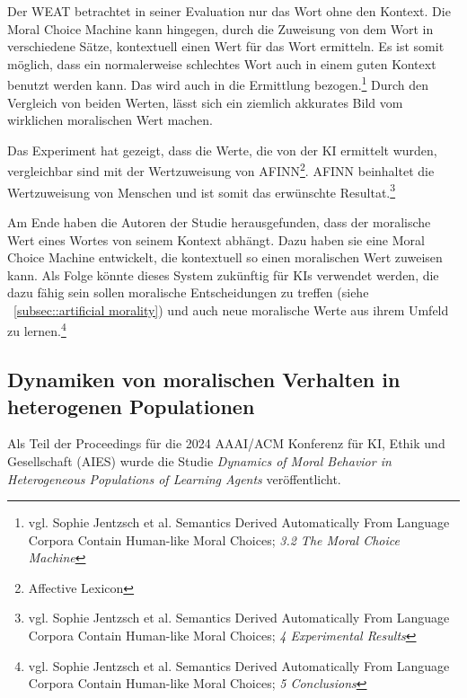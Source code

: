 Der WEAT betrachtet in seiner Evaluation nur das Wort ohne den Kontext.
Die Moral Choice Machine kann hingegen, durch die Zuweisung von dem Wort in verschiedene Sätze, kontextuell einen Wert für das
Wort ermitteln.
Es ist somit möglich, dass ein normalerweise schlechtes Wort auch in einem guten Kontext benutzt werden kann.
Das wird auch in die Ermittlung bezogen.\footnote{vgl. Sophie Jentzsch et al. Semantics Derived Automatically From Language Corpora Contain Human-like Moral Choices; \textit{3.2 The Moral Choice Machine}}
Durch den Vergleich von beiden Werten, lässt sich ein ziemlich akkurates Bild vom wirklichen moralischen Wert machen.

Das Experiment hat gezeigt, dass die Werte, die von der KI ermittelt wurden, vergleichbar sind mit der Wertzuweisung von AFINN\footnote{Affective Lexicon}.
AFINN beinhaltet die Wertzuweisung von Menschen und ist somit das erwünschte Resultat.\footnote{vgl. Sophie Jentzsch et al. Semantics Derived Automatically From Language Corpora Contain Human-like Moral Choices; \textit{4 Experimental Results}}

Am Ende haben die Autoren der Studie herausgefunden, dass der moralische Wert eines Wortes von seinem Kontext abhängt.
Dazu haben sie eine Moral Choice Machine entwickelt, die kontextuell so einen moralischen Wert zuweisen kann.
Als Folge könnte dieses System zukünftig für KIs verwendet werden, die dazu fähig sein sollen moralische Entscheidungen zu treffen (siehe ~\ref{subsec::artificial morality})
und auch neue moralische Werte aus ihrem Umfeld zu lernen.\footnote{vgl. Sophie Jentzsch et al. Semantics Derived Automatically From Language Corpora Contain Human-like Moral Choices; \textit{5 Conclusions}}

\subsection{Dynamiken von moralischen Verhalten in heterogenen Populationen}\label{subsec::dynamiken moralischen verhalten}

Als Teil der Proceedings für die 2024 AAAI/ACM Konferenz für KI, Ethik und Gesellschaft (AIES) wurde die Studie
\textit{Dynamics of Moral Behavior in Heterogeneous Populations of Learning Agents} veröffentlicht.

